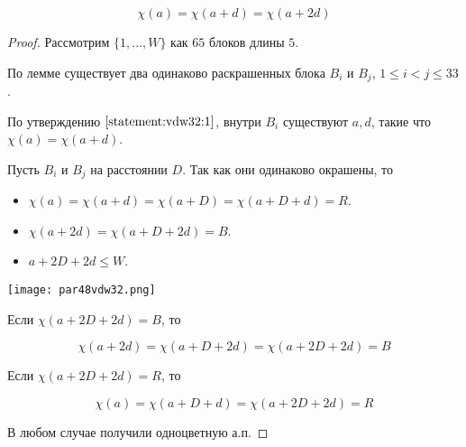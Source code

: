 \begin{normalsize}
\begin{theorem}
    \[ \chi(a) = \chi(a + d) = \chi(a + 2d) \]
\end{theorem}

\begin{proof}

    Рассмотрим $\{1, \ldots, W\}$ как $65$ блоков длины $5$.

    По лемме существует два одинаково раскрашенных блока $B_i$ и $B_j$, $1 \leq i < j \leq 33$.

    По утверждению $\ref*{statement:vdw32:1}$, внутри $B_i$ существуют $a, d$, такие что $\chi(a) = \chi(a + d)$.

    Пусть $B_i$ и $B_j$ на расстоянии $D$. Так как они одинаково окрашены, то 

    \begin{itemize}
        \item $\chi(a) = \chi(a + d) = \chi(a + D) = \chi(a + D + d) = R$.
        
        \item $\chi(a + 2d) = \chi(a + D + 2d) = B$.
        
        \item $a + 2D + 2d \leq W$.
    \end{itemize}

    \begin{center}
        \texttt{[image: par48vdw32.png]}
    \end{center}

    Если $\chi(a + 2D + 2d) = B$, то 

    \[ \chi(a + 2d) = \chi(a + D + 2d) = \chi(a + 2D + 2d) = B \]

    Если $\chi(a + 2D + 2d) = R$, то

    \[ \chi(a) = \chi(a + D + d) = \chi(a + 2D + 2d) = R \]

    В любом случае получили одноцветную а.п.
\end{proof}


\end{normalsize}